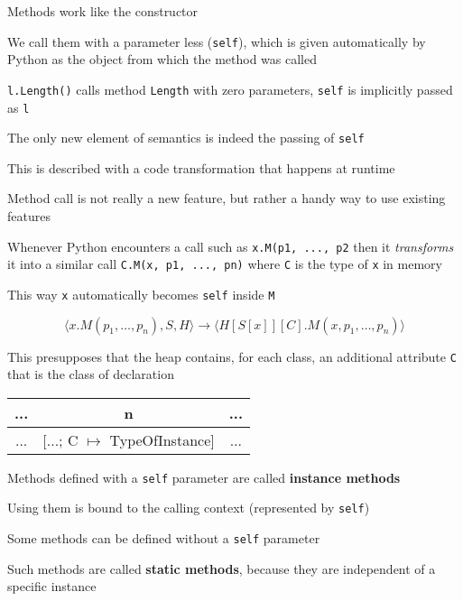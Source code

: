 \documentclass{beamer}
\begin{document}
\begin{slide}{
\item Methods work like the constructor
\item We call them with a parameter less (\texttt{self}), which is given automatically by Python as the object from which the method was called
\item \texttt{l.Length()} calls method \texttt{Length} with zero parameters, \texttt{self} is implicitly passed as \texttt{l}
}\end{slide}

\begin{slide}{
\item The only new element of semantics is indeed the passing of \texttt{self}
\item This is described with a code transformation that happens at runtime
\item Method call is not really a new feature, but rather a handy way to use existing features
}\end{slide}

\begin{slide}{
\item Whenever Python encounters a call such as \texttt{x.M(p1, ..., p2} then it \textit{transforms} it into a similar call \texttt{C.M(x, p1, ..., pn)} where \texttt{C} is the type of \texttt{x} in memory
\item This way \texttt{x} automatically becomes \texttt{self} inside \texttt{M}

$$\langle x.M(p_1,\dots,p_n), S, H \rangle \rightarrow \langle H[S[x]][C].M(x,p_1,\dots,p_n) \rangle$$

\item This presupposes that the heap contains, for each class, an additional attribute \texttt{C} that is the class of declaration

\begin{tabular}{|c|c|c|}
\hline
... & n & ... \\
\hline
... & [...; C $\mapsto$ TypeOfInstance] & ... \\
\hline
\end{tabular}
}\end{slide}

\begin{slide}{
\item Methods defined with a \texttt{self} parameter are called \textbf{instance methods}
\item Using them is bound to the calling context (represented by \texttt{self})
\item Some methods can be defined without a \texttt{self} parameter
\item Such methods are called \textbf{static methods}, because they are independent of a specific instance
}\end{slide}
\end{document}
